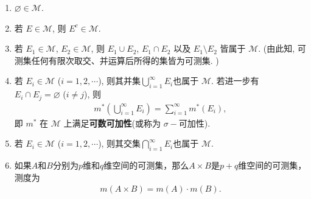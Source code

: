 \documentclass[../../main.tex]{subfiles}
\begin{document}
\begin{theorem}[可测集的性质]\label{theorem:可测集的性质}
\begin{enumerate}[(1)]
\item \(\varnothing \in \mathscr{M}\).
\item 若 \(E \in \mathscr{M}\), 则 \(E^c \in \mathscr{M}\).

\item 若 \(E_1 \in \mathscr{M}\), \(E_2 \in \mathscr{M}\), 则 \(E_1 \cup E_2\), \(E_1 \cap E_2\) 以及 \(E_1 \setminus E_2\) 皆属于 \(\mathscr{M}\). (由此知, 可测集任何有限次取交、并运算后所得的集皆为可测集. )
\item 若 \(E_i \in \mathscr{M}\) (\(i = 1,2,\cdots\)), 则其并集$\bigcup_{i = 1}^{\infty} E_i$也属于 \(\mathscr{M}\). 若进一步有 \(E_i \cap E_j = \varnothing\) (\(i \neq j\)), 则
\begin{align*}
m^*\left(\bigcup_{i = 1}^{\infty} E_i\right) = \sum_{i = 1}^{\infty} m^*(E_i),
\end{align*}
即 \(m^*\) 在 \(\mathscr{M}\) 上满足\textbf{可数可加性}(或称为 \(\sigma -\)可加性).

\item 若 \(E_i \in \mathscr{M}\) (\(i = 1,2,\cdots\)), 则其交集$\bigcap_{i = 1}^{\infty} E_i$也属于 \(\mathscr{M}\). 

\item 如果$A$和$B$分别为$p$维和$q$维空间的可测集，那么$A\times B$是$p + q$维空间的可测集，测度为
\begin{align*}
m(A\times B)=m(A)\cdot m(B).
\end{align*}
\end{enumerate}
\end{theorem}
\end{document}
